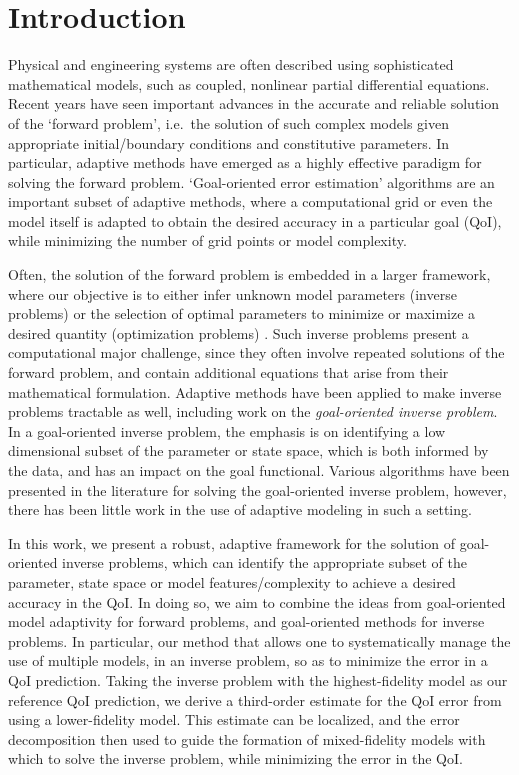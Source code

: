 \section{Introduction}
%
Physical and engineering systems are often described using sophisticated mathematical models, such as coupled, nonlinear partial differential equations. Recent years have seen important advances in the accurate and reliable solution of the `forward problem', i.e.\ the solution of such complex models given appropriate initial/boundary conditions and constitutive parameters. In particular, adaptive methods have emerged as a highly effective paradigm for solving the forward problem. `Goal-oriented error estimation' algorithms are an important subset of adaptive methods, where a computational grid or even the model itself is adapted to obtain the desired accuracy in a particular goal (QoI), while minimizing the number of grid points or model complexity.

Often, the solution of the forward problem is embedded in a larger framework, where our objective is to either infer unknown model parameters (inverse problems) or the selection of optimal parameters to minimize or maximize a desired quantity (optimization problems) \cite{Taran05, BanksKuhn89}. Such inverse problems present a computational major challenge, since they often involve repeated solutions of the forward problem, and contain additional equations that arise from their mathematical formulation. Adaptive methods have been applied to make inverse problems tractable as well, including work on the \textit{goal-oriented inverse problem}. In a goal-oriented inverse problem, the emphasis is on identifying a low dimensional subset of the parameter or state space, which is both informed by the data, and has an impact on the goal functional. Various algorithms have been presented in the literature for solving the goal-oriented inverse problem, however, there has been little work in the use of adaptive modeling in such a setting.

In this work, we present a robust, adaptive framework for the solution of goal-oriented inverse problems, which can identify the appropriate subset of the parameter, state space or model features/complexity to achieve a desired accuracy in the QoI. In doing so, we aim to combine the ideas from goal-oriented model adaptivity for forward problems, and goal-oriented methods for inverse problems. In particular, our method that allows one to systematically manage the use of multiple models, in an inverse problem, so as to minimize the error in a QoI prediction. Taking the inverse problem with the highest-fidelity model as our reference QoI prediction, we derive a third-order estimate for the QoI error from using a lower-fidelity model. This estimate can be localized, and the error decomposition then used to guide the formation of mixed-fidelity models with which to solve the inverse problem, while minimizing the error in the QoI.

